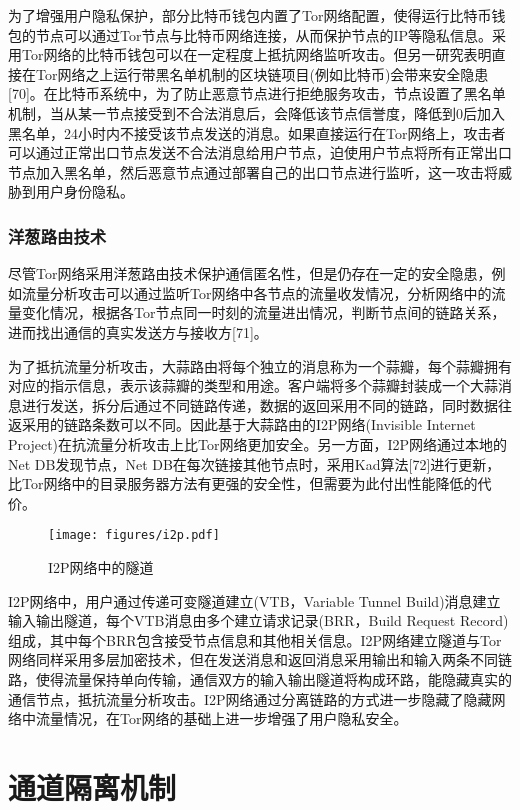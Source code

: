 为了增强用户隐私保护，部分比特币钱包内置了Tor网络配置，使得运行比特币钱包的节点可以通过Tor节点与比特币网络连接，从而保护节点的IP等隐私信息。采用Tor网络的比特币钱包可以在一定程度上抵抗网络监听攻击。但另一研究表明直接在Tor网络之上运行带黑名单机制的区块链项目(例如比特币)会带来安全隐患[70]。在比特币系统中，为了防止恶意节点进行拒绝服务攻击，节点设置了黑名单机制，当从某一节点接受到不合法消息后，会降低该节点信誉度，降低到0后加入黑名单，24小时内不接受该节点发送的消息。如果直接运行在Tor网络上，攻击者可以通过正常出口节点发送不合法消息给用户节点，迫使用户节点将所有正常出口节点加入黑名单，然后恶意节点通过部署自己的出口节点进行监听，这一攻击将威胁到用户身份隐私。

\subsubsection{洋葱路由技术}

尽管Tor网络采用洋葱路由技术保护通信匿名性，但是仍存在一定的安全隐患，例如流量分析攻击可以通过监听Tor网络中各节点的流量收发情况，分析网络中的流量变化情况，根据各Tor节点同一时刻的流量进出情况，判断节点间的链路关系，进而找出通信的真实发送方与接收方[71]。

为了抵抗流量分析攻击，大蒜路由将每个独立的消息称为一个蒜瓣，每个蒜瓣拥有对应的指示信息，表示该蒜瓣的类型和用途。客户端将多个蒜瓣封装成一个大蒜消息进行发送，拆分后通过不同链路传递，数据的返回采用不同的链路，同时数据往返采用的链路条数可以不同。因此基于大蒜路由的I2P网络(Invisible Internet Project)在抗流量分析攻击上比Tor网络更加安全。另一方面，I2P网络通过本地的Net DB发现节点，Net DB在每次链接其他节点时，采用Kad算法[72]进行更新，比Tor网络中的目录服务器方法有更强的安全性，但需要为此付出性能降低的代价。

\begin{figure}
\centering
\texttt{[image: figures/i2p.pdf]}
\caption{I2P网络中的隧道}
\label{fig:i2p}
\end{figure}

I2P网络中，用户通过传递可变隧道建立(VTB，Variable Tunnel Build)消息建立输入输出隧道，每个VTB消息由多个建立请求记录(BRR，Build Request Record)组成，其中每个BRR包含接受节点信息和其他相关信息。I2P网络建立隧道与Tor网络同样采用多层加密技术，但在发送消息和返回消息采用输出和输入两条不同链路，使得流量保持单向传输，通信双方的输入输出隧道将构成环路，能隐藏真实的通信节点，抵抗流量分析攻击。I2P网络通过分离链路的方式进一步隐藏了隐藏网络中流量情况，在Tor网络的基础上进一步增强了用户隐私安全。

\section{通道隔离机制}

